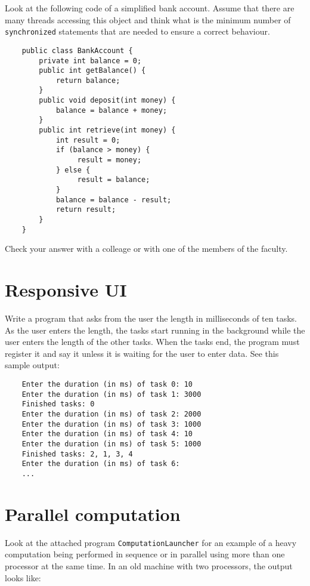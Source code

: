\documentclass{article}
\begin{document}
Look at the following code of a simplified bank account. Assume that
there are many threads accessing this object and think what is the
minimum number of \verb+synchronized+ statements that are needed to
ensure a correct behaviour. 

\begin{verbatim}
    public class BankAccount {
        private int balance = 0;
        public int getBalance() {
            return balance;
        }
        public void deposit(int money) {
            balance = balance + money;
        }
        public int retrieve(int money) {
            int result = 0;
            if (balance > money) {
                 result = money;
            } else {
                 result = balance;
            }
            balance = balance - result;
            return result;
        }
    }
\end{verbatim}

Check your answer with a colleage or with one of the members of the
faculty. 

\section{Responsive UI}
\label{sec:responsive-ui}

Write a program that asks from the user the length in milliseconds of
ten tasks. As the user enters the length, the tasks start running in
the background while the user enters the length of the other
tasks. When the tasks end, the program must register it and say it
unless it is waiting for the user to enter data. See this sample
output: 

\begin{verbatim}
    Enter the duration (in ms) of task 0: 10
    Enter the duration (in ms) of task 1: 3000
    Finished tasks: 0
    Enter the duration (in ms) of task 2: 2000
    Enter the duration (in ms) of task 3: 1000
    Enter the duration (in ms) of task 4: 10
    Enter the duration (in ms) of task 5: 1000
    Finished tasks: 2, 1, 3, 4
    Enter the duration (in ms) of task 6: 
    ...
\end{verbatim}

\section{Parallel computation}
\label{sec:parallel-computation}

Look at the attached program \verb+ComputationLauncher+ for an example
of a heavy computation being performed in sequence or in parallel
using more than one processor at the same time. In an old machine with
two processors, the output looks like: 
\end{document}
